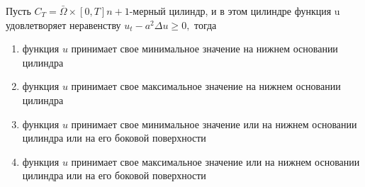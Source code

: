 Пусть \(C_T=\bar{\Omega }\times \left[0,T\right] n+1\)-мерный цилиндр, и в этом цилиндре функция u удовлетворяет неравенству \(u_t-a^2\Delta u \geq 0,\) тогда

\begin{enumerate}[label=\arabic*)]
    \item функция \(u\) принимает свое минимальное значение на нижнем основании цилиндра
    \item функция \(u\) принимает свое максимальное значение на нижнем основании цилиндра
    \item функция \(u\) принимает свое минимальное значение или на нижнем основании цилиндра или на его боковой поверхности
    \item функция \(u\) принимает свое максимальное значение или на нижнем основании цилиндра или на его боковой поверхности
\end{enumerate}

